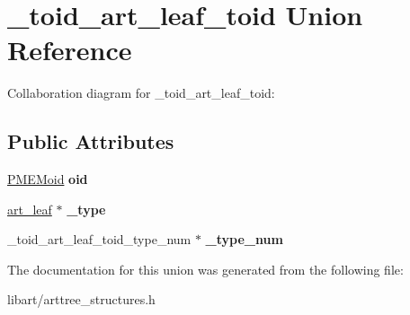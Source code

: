 \hypertarget{union__toid__art__leaf__toid}{}\section{\+\_\+toid\+\_\+art\+\_\+leaf\+\_\+toid Union Reference}
\label{union__toid__art__leaf__toid}


Collaboration diagram for \+\_\+toid\+\_\+art\+\_\+leaf\+\_\+toid\+:
\subsection*{Public Attributes}
\begin{DoxyCompactItemize}
\item 
\mbox{\label{union__toid__art__leaf__toid_a9d1049b2118c67e31a5b677feec8e690}} 
\hyperlink{structpmemoid}{P\+M\+E\+Moid} {\bfseries oid}
\item 
\mbox{\label{union__toid__art__leaf__toid_a4b5bc6854e369c59d6695219efb69156}} 
\hyperlink{struct__art__leaf}{art\+\_\+leaf} $\ast$ {\bfseries \+\_\+type}
\item 
\mbox{\label{union__toid__art__leaf__toid_abf8bfa16199858dc92f318525faa9b99}} 
\+\_\+toid\+\_\+art\+\_\+leaf\+\_\+toid\+\_\+type\+\_\+num $\ast$ {\bfseries \+\_\+type\+\_\+num}
\end{DoxyCompactItemize}


The documentation for this union was generated from the following file\+:\begin{DoxyCompactItemize}
\item 
libart/arttree\+\_\+structures.\+h\end{DoxyCompactItemize}

